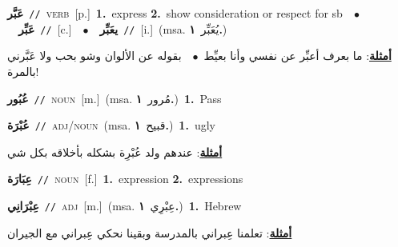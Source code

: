 \documentclass[10pt,a4paper,twoside]{article} %
\begin{document}
\begin{multicols}{2}
{\setlength\topsep{0pt}\textbf{\foreignlanguage{arabic}{عَبَّر}}\ {\color{gray}\texttt{//}\color{black}}\ \textsc{verb}\ [p.]\ \textbf{1.}~express  \textbf{2.}~show consideration or respect for sb\ \ $\bullet$\ \ \setlength\topsep{0pt}\textbf{\foreignlanguage{arabic}{عَبِّر}}\ {\color{gray}\texttt{//}\color{black}}\ [c.]\ \ $\bullet$\ \ \setlength\topsep{0pt}\textbf{\foreignlanguage{arabic}{يعَبِّر}}\ {\color{gray}\texttt{//}\color{black}}\ [i.]\ \color{gray}(msa. \foreignlanguage{arabic}{يُعَبِّر}~\foreignlanguage{arabic}{\textbf{١.}})\color{black}\  \begin{flushright}\color{gray}\foreignlanguage{arabic}{\textbf{\underline{\foreignlanguage{arabic}{أمثلة}}}: ما بعرف أعبِّر عن نفسي وأنا بعيِّط\ $\bullet$\ \  بقوله عن الألوان وشو بحب ولا عَبَّرني بالمرة!}\end{flushright}\color{black}} \vspace{2mm}

{\setlength\topsep{0pt}\textbf{\foreignlanguage{arabic}{عُبُور}}\ {\color{gray}\texttt{//}\color{black}}\ \textsc{noun}\ [m.]\ \color{gray}(msa. \foreignlanguage{arabic}{مُرور}~\foreignlanguage{arabic}{\textbf{١.}})\color{black}\ \textbf{1.}~Pass\ } \vspace{2mm}

{\setlength\topsep{0pt}\textbf{\foreignlanguage{arabic}{عُبْرَة}}\ {\color{gray}\texttt{//}\color{black}}\ \textsc{adj/noun}\ \color{gray}(msa. \foreignlanguage{arabic}{قبيح}~\foreignlanguage{arabic}{\textbf{١.}})\color{black}\ \textbf{1.}~ugly\  \begin{flushright}\color{gray}\foreignlanguage{arabic}{\textbf{\underline{\foreignlanguage{arabic}{أمثلة}}}: عندهم ولد عُبْرِة بشكله بأخلاقه بكل شي}\end{flushright}\color{black}} \vspace{2mm}

{\setlength\topsep{0pt}\textbf{\foreignlanguage{arabic}{عِبَارَة}}\ {\color{gray}\texttt{//}\color{black}}\ \textsc{noun}\ [f.]\ \textbf{1.}~expression  \textbf{2.}~expressions\ } \vspace{2mm}

{\setlength\topsep{0pt}\textbf{\foreignlanguage{arabic}{عِبْرَانِي}}\ {\color{gray}\texttt{//}\color{black}}\ \textsc{adj}\ [m.]\ \color{gray}(msa. \foreignlanguage{arabic}{عِبْرِي}~\foreignlanguage{arabic}{\textbf{١.}})\color{black}\ \textbf{1.}~Hebrew\  \begin{flushright}\color{gray}\foreignlanguage{arabic}{\textbf{\underline{\foreignlanguage{arabic}{أمثلة}}}: تعلمنا عِبراني بالمدرسة وبقينا نحكي عِبراني مع الجيران}\end{flushright}\color{black}} \vspace{2mm}


\end{multicols}
\end{document}
